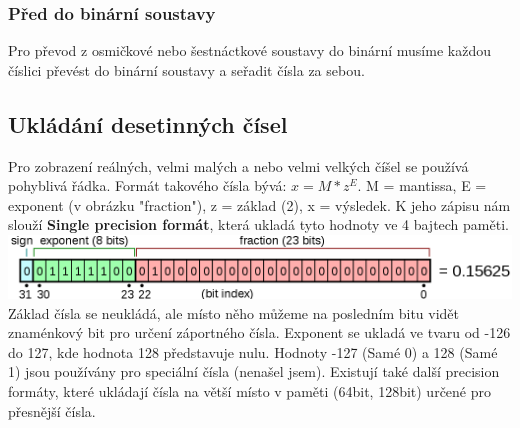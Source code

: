 \subsubsection{Před do binární soustavy}
Pro převod z osmičkové nebo šestnáctkové soustavy do binární musíme každou číslici převést do binární soustavy a seřadit čísla za sebou.
\subsection{Ukládání desetinných čísel}
Pro zobrazení reálných, velmi malých a nebo velmi velkých číšel se používá pohyblivá řádka.
Formát takového čísla bývá: $x = M*z^E$.
M = mantissa, E = exponent (v obrázku "fraction"), z = základ (2), x = výsledek.
K jeho zápisu nám slouží \textbf{Single precision formát}, která ukladá tyto hodnoty ve 4 bajtech paměti.\\

\includegraphics[width=\linewidth]{TVY-POS/Ciselne-soustavy/single_precision.png}\\

Základ čísla se neukládá, ale místo něho můžeme na posledním bitu vidět znaménkový bit pro určení záportného čísla.
Exponent se ukladá ve tvaru od -126 do 127, kde hodnota 128 představuje nulu.
Hodnoty -127 (Samé 0) a 128 (Samé 1) jsou používány pro speciální čísla (nenašel jsem).
Existují také další precision formáty, které ukládají čísla na větší místo v paměti (64bit, 128bit) určené pro přesnější čísla.
